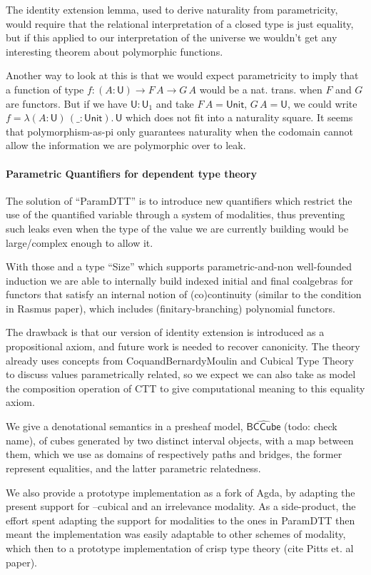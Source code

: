 \documentclass{book}
\newcommand{\U}{\mathsf{U}}
\newcommand{\sd}{.\,}
\begin{document}
\begin{itemize}
    The identity extension lemma, used to derive naturality from
    parametricity, would require that the relational interpretation of
    a closed type is just equality, but if this applied to our
    interpretation of the universe we wouldn't get any interesting
    theorem about polymorphic functions.

    Another way to look at this is that we would expect parametricity
    to imply that a function of type $f : (A : \U) \to F\,A \to G\,A$
    would be a nat. trans. when $F$ and $G$ are functors.  But if we have
    $\U : \U_1$ and take $F\,A = \mathsf{Unit}$, $G\,A = \U$, we could write
    $f = \lambda (A : \U)\, (\_ : \mathsf{Unit})\sd \U$ which does not fit into a naturality square.
    It seems that polymorphism-as-pi only guarantees naturality when
    the codomain cannot allow the information we are polymorphic over
    to leak.


\paragraph{Parametric Quantifiers for dependent type theory}
    The solution of ``ParamDTT'' is to introduce new quantifiers which
    restrict the use of the quantified variable through a system of
    modalities, thus preventing such leaks even when the type of the
    value we are currently building would be large/complex enough to
    allow it.

    With those and a type ``Size'' which supports parametric-and-non
    well-founded induction we are able to internally build indexed
    initial and final coalgebras for functors that satisfy an
    internal notion of (co)continuity (similar to the condition in
    Rasmus paper), which includes (finitary-branching) polynomial
    functors.

    The drawback is that our version of identity extension is
    introduced as a propositional axiom, and future work is needed to
    recover canonicity. The theory already uses concepts from
    CoquandBernardyMoulin and Cubical Type Theory to discuss values
    parametrically related, so we expect we can also take as model the
    composition operation of CTT to give computational meaning to this
    equality axiom.

    We give a denotational semantics in a presheaf model,
    $\hat{\mathsf{BCCube}}$ (todo: check name), of cubes generated by two distinct interval
    objects, with a map between them, which we use as domains of
    respectively paths and bridges, the former represent equalities,
    and the latter parametric relatedness.

    We also provide a prototype implementation as a fork of Agda, by
    adapting the present support for --cubical and an irrelevance
    modality. As a side-product, the effort spent adapting the support
    for modalities to the ones in ParamDTT then meant the
    implementation was easily adaptable to other schemes of modality,
    which then to a prototype implementation of crisp type theory
    (cite Pitts et. al paper).
    \end{itemize}
\end{document}
